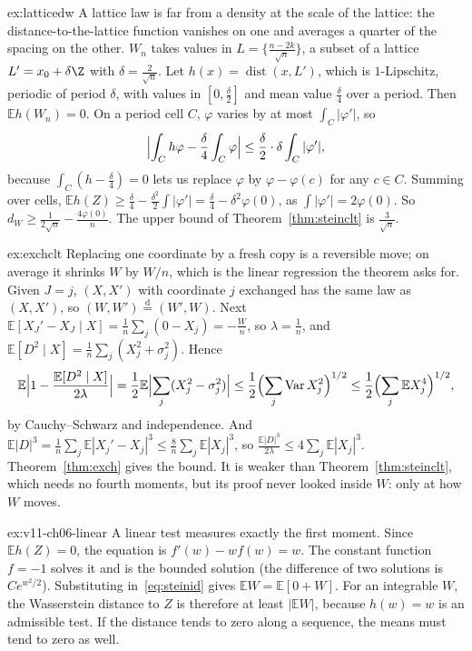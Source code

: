 \begin{solution}{ex:latticedw}
\idea A lattice law is far from a density at the scale of the lattice: the distance-to-the-lattice function vanishes on one and averages a quarter of the
spacing on the other.
\writeup $W_n$ takes values in $L=\{\frac{n-2k}{\sqrt n}\}$, a subset of a lattice $L'=x_0+\delta\Z$ with $\delta=\frac2{\sqrt n}$. Let $h(x)=\operatorname{dist}(x,L')$, which is
$1$-Lipschitz, periodic of period $\delta$, with values in $[0,\frac\delta2]$ and mean value $\frac\delta4$ over a period. Then $\mathbb Eh(W_n)=0$. On a period cell
$C$, $\varphi$ varies by at most $\int_C|\varphi'|$, so
\[
\Bigl|\int_Ch\varphi-\frac\delta4\int_C\varphi\Bigr|\le\frac\delta2\cdot\delta\int_C|\varphi'| ,
\]
because $\int_C(h-\frac\delta4)=0$ lets us replace $\varphi$ by $\varphi-\varphi(c)$ for any $c\in C$. Summing over cells, $\mathbb Eh(Z)\ge\frac\delta4-\frac{\delta^2}2\int|\varphi'|=\frac\delta4-\delta^2\varphi(0)$,
as $\int|\varphi'|=2\varphi(0)$. So $d_W\ge\frac1{2\sqrt n}-\frac{4\varphi(0)}n$. The upper bound of Theorem~\ref{thm:steinclt} is $\frac3{\sqrt n}$.
\end{solution}

\begin{solution}{ex:exchclt}
\idea Replacing one coordinate by a fresh copy is a reversible move; on average it shrinks $W$ by $W/n$, which is the linear regression the theorem asks for.
\writeup Given $J=j$, $(X,X')$ with coordinate $j$ exchanged has the same law as $(X,X')$, so $(W,W')\overset{\mathrm d}=(W',W)$. Next
$\mathbb E[X_J'-X_J\mid X]=\frac1n\sum_j(0-X_j)=-\frac Wn$, so $\lambda=\frac1n$, and $\mathbb E[D^2\mid X]=\frac1n\sum_j(X_j^2+\sigma_j^2)$. Hence
\[
\mathbb E\Bigl|1-\frac{\mathbb E[D^2\mid X]}{2\lambda}\Bigr|=\frac12\mathbb E\Bigl|\sum_j(X_j^2-\sigma_j^2)\Bigr|\le\frac12\Bigl(\sum_j\operatorname{Var}X_j^2\Bigr)^{1/2}\le\frac12\Bigl(\sum_j\mathbb EX_j^4\Bigr)^{1/2},
\]
by Cauchy--Schwarz and independence. And $\mathbb E|D|^3=\frac1n\sum_j\mathbb E|X_j'-X_j|^3\le\frac8n\sum_j\mathbb E|X_j|^3$, so $\frac{\mathbb E|D|^3}{2\lambda}\le4\sum_j\mathbb E|X_j|^3$. Theorem~\ref{thm:exch}
gives the bound. It is weaker than Theorem~\ref{thm:steinclt}, which needs no fourth moments, but its proof never looked inside $W$: only at how $W$ moves.
\end{solution}

\begin{solution}{ex:v11-ch06-linear}
\idea A linear test measures exactly the first moment.
\writeup Since $\mathbb Eh(Z)=0$, the equation is $f'(w)-wf(w)=w$. The constant function $f=-1$ solves it and is the bounded solution (the difference of two solutions is $Ce^{w^2/2}$). Substituting in~\eqref{eq:steinid} gives $\mathbb EW=\mathbb E[0+W]$. For an integrable $W$, the Wasserstein distance to $Z$ is therefore at least $|\mathbb EW|$, because $h(w)=w$ is an admissible test. If the distance tends to zero along a sequence, the means must tend to zero as well.
\end{solution}

